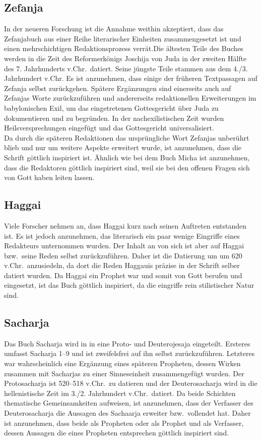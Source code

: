 \subsection*{Zefanja}
In der neueren Forschung ist die Annahme weithin akzeptiert, dass das Zefanjabuch aus einer Reihe literarischer Einheiten zusammengesetzt ist und einen mehrschichtigen Redaktionsprozess verrät.Die ältesten Teile des Buches werden in die Zeit des Reformerkönigs Joschija von Juda in der zweiten Hälfte des 7. Jahrhunderts v.Chr.\ datiert. Seine jüngste Teile stammen aus dem 4./3. Jahrhundert v.Chr. Es ist anzunehmen, dass einige der früheren Textpassagen auf Zefanja selbst zurückgehen. Spätere Ergänzungen sind einerseits auch auf Zefanjas Worte zurückzuführen und andererseits redaktionellen Erweiterungen im babylonischen Exil, um das eingetretenen Gottesgericht über Juda zu dokumentieren und zu begründen. In der nachexilistischen Zeit wurden Heilsversprechungen eingefügt und das Gottesgericht universalisiert.
\\
Da durch die späteren Redaktionen das ursprüngliche Wort Zefanjas unberührt blieb und nur um weitere Aspekte erweitert wurde, ist anzunehmen, dass die Schrift göttlich inspiriert ist. Ähnlich wie bei dem Buch Micha ist anzunehmen, dass die Redaktoren göttlich inspiriert sind, weil sie bei den offenen Fragen sich von Gott haben leiten lassen.

\subsection*{Haggai}
Viele Forscher nehmen an, dass Haggai kurz nach seinen Auftreten entstanden ist. Es ist jedoch anzunehmen, das literarisch ein paar wenige Eingriffe eines Redakteurs unternommen wurden. Der Inhalt an von sich ist aber auf Haggai bzw.\ seine Reden selbst zurückzuführen. Daher ist die Datierung um um 620 v.Chr.\ anzusiedeln, da dort die Reden Haggauis präzise in der Schrift selber datiert wurden. Da Haggai ein Prophet war und somit von Gott berufen und eingesetzt, ist das Buch göttlich inspiriert, da die eingriffe rein stilistischer Natur sind.

\subsection*{Sacharja}
Das Buch Sacharja wird in in eine Proto- und Deuterojesaja eingeteilt. Ersteres umfasst Sacharja 1--9 und ist zweifelsfrei auf ihn selbst zurückzuführen. Letzteres war wahrscheinlich eine Ergänzung eines späteren Propheten, dessen Wirken zusammen mit Sacharjas zu einer Sinneseinheit zusammengefügt wurden. Der Protosacharja ist 520--518 v.Chr.\ zu datieren und der Deuterosacharja wird in die hellenistische Zeit im 3./2. Jahrhundert v.Chr.\ datiert. Da beide Schichten thematische Gemeinsamkeiten aufweisen, ist anzunehmen, dass der Verfasser des Deuterosacharja die Aussagen des Sachaarja erweiter bzw.\ vollendet hat. Daher ist anzunehmen, dass beide als Propheten oder als Prophet und als Verfasser, dessen Aussagen die eines Propheten entsprechen göttlich inspiriert sind.

